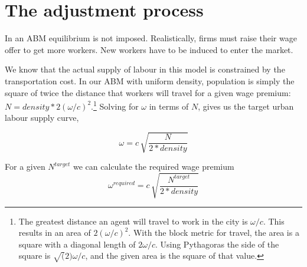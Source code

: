 \section{The adjustment process}
In an ABM equilibrium is not imposed. Realistically, firms must raise their wage offer to get more workers. New workers have to be induced to enter the market. %



We know that the actual supply of labour in this model is constrained by the transportation cost. In our ABM with uniform density, population is simply the square of twice the distance that workers will travel for a given wage premium: $N=density*2(\omega/c)^2$.\footnote{The greatest distance  an agent will travel to work in the city is $\omega/c$. This results in an area of $2(\omega/c)^2$. With the block metric for travel, the area is a square with a diagonal length of $2\omega/c$. Using Pythagoras the side of the square is $\sqrt(2)\omega/c$, and the given area is the square of that value.} %
Solving for $\omega$ in terms of $N$, %
gives us the target urban labour supply curve, 

\begin{equation}
   \omega= c\, \sqrt{\frac{N}{2 * density}}
\label{eqn:Labour-supply}\end{equation}

For a given $N^{target}$ we can calculate the required wage premium
\begin{equation}
   \omega^{required}= c\, \sqrt{\frac{N^{target}}{2 * density}}
\label{eqn:Labour-supply}\end{equation}


